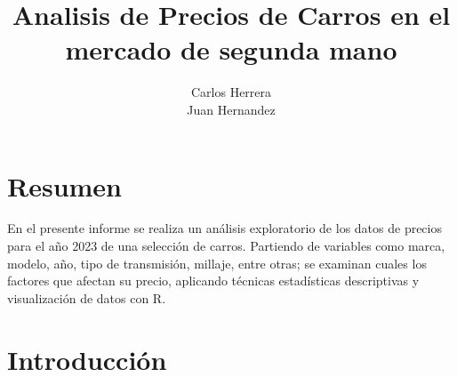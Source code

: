 \documentclass[oneside,11pt]{Latex/Classes/PhDthesisPSnPDF}
\title{Analisis de Precios de Carros en el mercado de segunda mano}
\author{Carlos Herrera \\ Juan Hernandez}
\begin{document}
\maketitle

\frontmatter


\setcounter{secnumdepth}{3}
\setcounter{tocdepth}{3}

\tableofcontents



\cleardoublepage

  \cleardoublepage       %
  \chapter*{Resumen}     %
  
  En el presente informe se realiza un análisis exploratorio de los
datos de precios para el año 2023 de una selección de carros. Partiendo
de variables como marca, modelo, año, tipo de transmisión, millaje,
entre otras; se examinan cuales los factores que afectan su precio,
aplicando técnicas estadísticas descriptivas y visualización de datos
con R.             %
  
  \cleardoublepage

\mainmatter
\def\baselinestretch{1.5}

\chapter*{Introducción}
\end{document}
